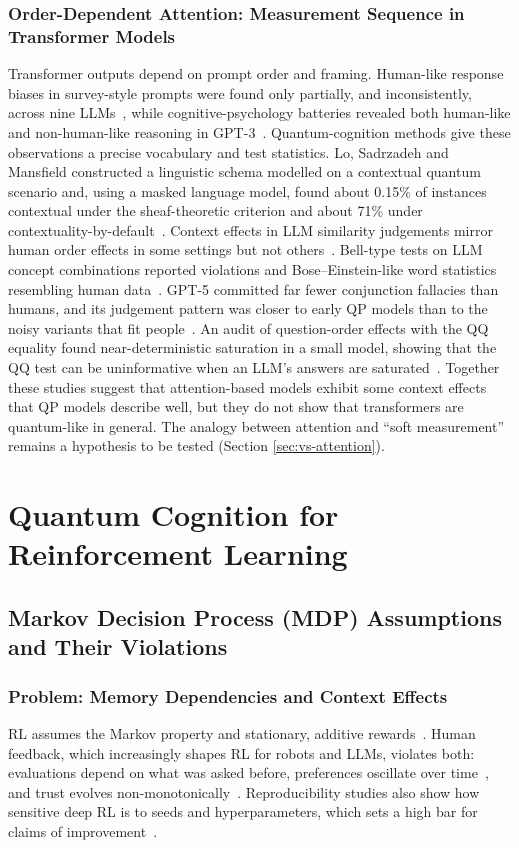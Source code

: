 \documentclass[pdflatex,sn-basic]{sn-jnl}
\begin{document}
\subsubsection{Order-Dependent Attention: Measurement Sequence in Transformer Models}
Transformer outputs depend on prompt order and framing. Human-like response biases in survey-style prompts were found only partially, and inconsistently, across nine LLMs~\citep{Tjuatja2024}, while cognitive-psychology batteries revealed both human-like and non-human-like reasoning in GPT-3~\citep{Binz2023}. Quantum-cognition methods give these observations a precise vocabulary and test statistics. Lo, Sadrzadeh and Mansfield constructed a linguistic schema modelled on a contextual quantum scenario and, using a masked language model, found about 0.15\% of instances contextual under the sheaf-theoretic criterion and about 71\% under contextuality-by-default~\citep{Lo2025}. Context effects in LLM similarity judgements mirror human order effects in some settings but not others~\citep{Uprety2024}. Bell-type tests on LLM concept combinations reported violations and Bose--Einstein-like word statistics resembling human data~\citep{Aerts2026}. GPT-5 committed far fewer conjunction fallacies than humans, and its judgement pattern was closer to early QP models than to the noisy variants that fit people~\citep{Imannezhad2026}. An audit of question-order effects with the QQ equality found near-deterministic saturation in a small model, showing that the QQ test can be uninformative when an LLM's answers are saturated~\citep{Kang2026}. Together these studies suggest that attention-based models exhibit some context effects that QP models describe well, but they do not show that transformers are quantum-like in general. The analogy between attention and ``soft measurement'' remains a hypothesis to be tested (Section \ref{sec:vs-attention}).


\section{Quantum Cognition for Reinforcement Learning}\label{sec:rl}

\subsection{Markov Decision Process (MDP) Assumptions and Their Violations}\label{sec:mdp}

\subsubsection{Problem: Memory Dependencies and Context Effects}
RL assumes the Markov property and stationary, additive rewards~\citep{Sutton2018}. Human feedback, which increasingly shapes RL for robots and LLMs, violates both: evaluations depend on what was asked before, preferences oscillate over time~\citep{Kvam2021}, and trust evolves non-monotonically~\citep{Roeder2023}. Reproducibility studies also show how sensitive deep RL is to seeds and hyperparameters, which sets a high bar for claims of improvement~\citep{Henderson2018}.
\end{document}
